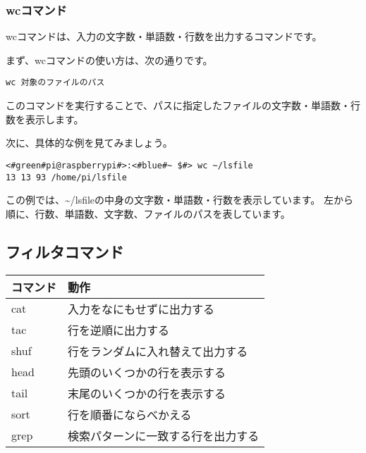 \subsubsection{wcコマンド}
wcコマンドは、入力の文字数・単語数・行数を出力するコマンドです。

まず、wcコマンドの使い方は、次の通りです。

\begin{lstlisting}[caption=wcコマンドの使い方, label=wc_usage]
wc 対象のファイルのパス
\end{lstlisting}

このコマンドを実行することで、パスに指定したファイルの文字数・単語数・行数を表示します。
    
次に、具体的な例を見てみましょう。

\begin{lstlisting}[caption=wcコマンドの実行例, label=wc_example]
<#green#pi@raspberrypi#>:<#blue#~ $#> wc ~/lsfile
13 13 93 /home/pi/lsfile
\end{lstlisting}

この例では、\textasciitilde/lsfileの中身の文字数・単語数・行数を表示しています。
左から順に、行数、単語数、文字数、ファイルのパスを表しています。

\begin{tcolorbox}[title=\useOmetoi]
    \begin{enumerate}
    \end{enumerate}
\end{tcolorbox}

\subsection{フィルタコマンド}
\begin{tabular}{ll}
    コマンド & 動作 \\ \hline
    cat & 入力をなにもせずに出力する \\
    tac & 行を逆順に出力する\\
    shuf & 行をランダムに入れ替えて出力する \\
    head & 先頭のいくつかの行を表示する \\
    tail & 末尾のいくつかの行を表示する\\
    sort & 行を順番にならべかえる\\
    grep & 検索パターンに一致する行を出力する\\ \hline
\end{tabular}

